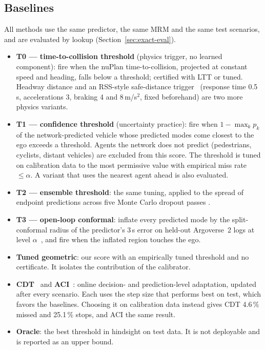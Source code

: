\documentclass[lettersize,journal]{IEEEtran}
\begin{document}
\subsection{Baselines}
\label{sec:baselines}
All methods use the same predictor, the same MRM and the same test
scenarios, and are evaluated by lookup (Section~\ref{sec:exact-eval}).
\begin{itemize}
\item \textbf{T0 --- time-to-collision threshold} (physics trigger, no learned component): fire when the nuPlan time-to-collision, projected at constant speed and heading, falls below a threshold; certified with LTT or tuned. Headway distance and an RSS-style safe-distance trigger~\cite{rss2017}
(response time 0.5\,s, accelerations 3, braking 4 and 8\,m/s$^2$, fixed
beforehand) are two more physics variants.
\item \textbf{T1 --- confidence threshold} (uncertainty practice): fire when
$1-\max_k p_k$ of the network-predicted vehicle whose predicted modes come
closest to the ego exceeds a threshold. Agents the network does not
predict (pedestrians, cyclists, distant vehicles) are excluded from this
score. The threshold is tuned on calibration data to the most permissive
value with empirical miss rate $\le\alpha$. A variant that uses the
nearest agent ahead is also evaluated.
\item \textbf{T2 --- ensemble threshold}: the same tuning, applied to the
spread of endpoint predictions across five Monte Carlo dropout passes
\cite{galghahramani2016}.
\item \textbf{T3 --- open-loop conformal}: inflate every predicted mode by
the split-conformal radius of the predictor's 3\,s error on held-out
Argoverse~2 logs at level $\alpha$~\cite{vovk2005}, and fire when the
inflated region touches the ego.
\item \textbf{Tuned geometric}: our score with an empirically tuned
threshold and no certificate. It isolates the contribution of the
calibrator.
\item \textbf{CDT}~\cite{cdt2024} and \textbf{ACI}~\cite{aci2021}: online
decision- and prediction-level adaptation, updated after every
scenario. Each uses the step size that performs best on test, which
favors the baselines. Choosing it on calibration data instead gives CDT
4.6\,\% missed and 25.1\,\% stops, and ACI the same result.
\item \textbf{Oracle}: the best threshold in hindsight on test data.
It is not deployable and is reported as an upper bound.
\end{itemize}
\end{document}
